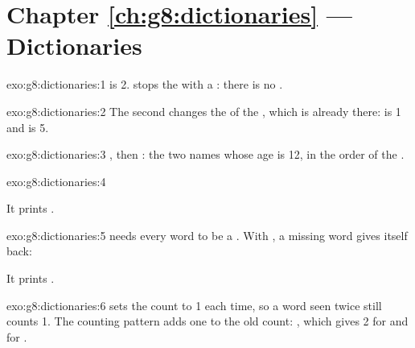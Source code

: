 \section*{Chapter \ref{ch:g8:dictionaries} --- Dictionaries}

\begin{solution}{exo:g8:dictionaries:1}
 is 2.  stops the  with a :
there is no  .
\end{solution}

\begin{solution}{exo:g8:dictionaries:2}
The second  changes the  of the  , which is
already there:  is 1 and  is 5.
\end{solution}

\begin{solution}{exo:g8:dictionaries:3}
, then : the two names whose age is 12, in the order of
the .
\end{solution}

\begin{solution}{exo:g8:dictionaries:4}
\label{lst:g8:dictionaries:sol-capitals}

It prints .
\end{solution}

\begin{solution}{exo:g8:dictionaries:5}
 needs every word to be a . With
, a missing word gives itself back:

\label{lst:g8:dictionaries:sol-translate}

It prints .
\end{solution}

\begin{solution}{exo:g8:dictionaries:6}
 sets the count to 1 each time, so a word seen twice
still counts 1. The counting pattern adds one to the old count:
, which gives 2 for  and
for .
\end{solution}

